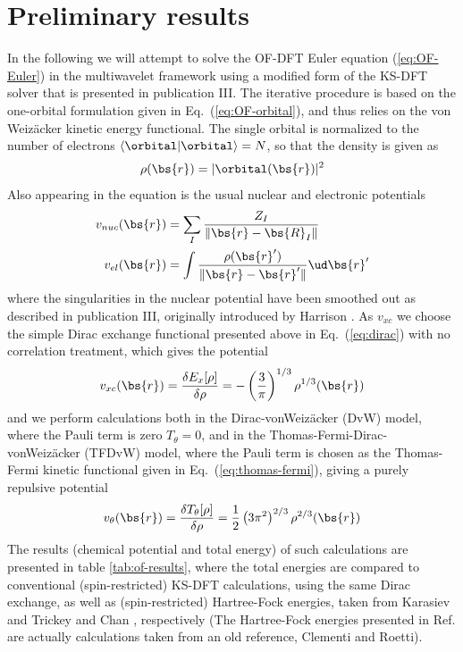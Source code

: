 \section{Preliminary results}
In the following we will attempt to solve the OF-DFT Euler equation (\ref{eq:OF-Euler}) in the multiwavelet 
framework using a modified form of the KS-DFT solver that is presented in publication III. The iterative
procedure is based on the one-orbital formulation given in Eq.~(\ref{eq:OF-orbital}), and thus relies on the
von Weiz\"{a}cker kinetic energy functional. The single orbital is normalized to the number of electrons 
$\langle\orbital|\orbital\rangle = N$, so that the density is given as
\begin{equation}
    \rho(\bs{r}) = |\orbital(\bs{r})|^2
\end{equation}
Also appearing in the equation is the usual nuclear and electronic potentials
\begin{align}
    v_{nuc}(\bs{r}) &= \sum_{I} \frac{Z_I}{\|\bs{r}-\bs{R}_I\|} \\
    v_{el}(\bs{r}) &= \int \frac{\rho(\bs{r}')}{\|\bs{r}-\bs{r}'\|} \ud\bs{r}'
\end{align}
where the singularities in the nuclear potential have been smoothed out as described in publication III, 
originally introduced by Harrison \etal\cite{Harrison:2004}. As $v_{xc}$ we choose the simple Dirac exchange
functional presented above in Eq.~(\ref{eq:dirac}) with no correlation treatment, which gives the potential
\begin{equation}
    v_{xc}(\bs{r}) = \frac{\delta E_x[\rho]}{\delta \rho} = -\left(\frac{3}{\pi}\right)^{1/3} \rho^{1/3}(\bs{r})
\end{equation}
and we perform calculations both in the Dirac-vonWeiz\"{a}cker (DvW) model, where the Pauli term is zero 
$T_\theta = 0$, and in the Thomas-Fermi-Dirac-vonWeiz\"{a}cker (TFDvW) model, where the Pauli term is chosen as
the Thomas-Fermi kinetic functional given in Eq.~(\ref{eq:thomas-fermi}), giving a purely repulsive potential
\begin{equation}
    v_\theta(\bs{r}) = \frac{\delta T_\theta[\rho]}{\delta\rho} = \frac{1}{2}\left(3\pi^2\right)^{2/3} \rho^{2/3}(\bs{r})
\end{equation}
The results (chemical potential and total energy) of such calculations are presented in table \ref{tab:of-results}, where
the total energies are compared to conventional (spin-restricted) KS-DFT calculations, using the same Dirac exchange,
as well as (spin-restricted) Hartree-Fock energies, taken from Karasiev and Trickey\cite{Karasiev:2012} and Chan 
\etal\cite{Chan:2000}, respectively (The Hartree-Fock energies presented in Ref.\cite{Chan:2000} are actually calculations 
taken from an old reference, Clementi and Roetti\cite{Clementi:1974}).

